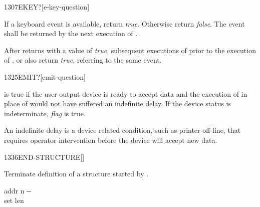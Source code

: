 
\begin{worddef}[EKEYq]{1307}{EKEY?}[e-key-question]
\item {}

	If a keyboard event is available, return \emph{true}. Otherwise
	return \emph{false}. The event shall be returned by the next
	execution of .

	After  returns with a value of \emph{true},
	subsequent executions of  prior to the execution of
	,  or  also return
	\emph{true}, referring to the same event.
\end{worddef}

\vspace*{-6ex}
\begin{worddef}[EMITq]{1325}{EMIT?}[emit-question]
\item {}

	 is true if the user output device is ready to
	accept data and the execution of  in place of
	 would not have suffered an indefinite delay. If
	the device status is indeterminate, \emph{flag} is true.

	\begin{rationale} %
		An indefinite delay is a device related condition, such as
		printer off-line, that requires operator intervention before
		the device will accept new data.
	\end{rationale}
\end{worddef}


\vspace*{-2ex}\enlargethispage{8ex}
\begin{worddef}{1336}{END-STRUCTURE}[]%
\item {}

	Terminate definition of a structure started by
	.


	\begin{implement} %

		\word{:} \tab{} addr n -{}- \\
		\tab {} \word{!} \word{;} \tab[4.2] set len
	\end{implement}
\end{worddef}

